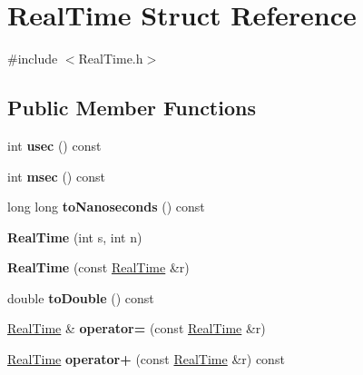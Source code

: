 \hypertarget{struct_real_time}{}\section{Real\+Time Struct Reference}
\label{struct_real_time}


{\ttfamily \#include $<$Real\+Time.\+h$>$}

\subsection*{Public Member Functions}
\begin{DoxyCompactItemize}
\item 
\mbox{\label{struct_real_time_a326b7e7bf06d9aa4bac192a15d92a8bd}} 
int {\bfseries usec} () const
\item 
\mbox{\label{struct_real_time_a82d58867cd3c682af9882abb4407645c}} 
int {\bfseries msec} () const
\item 
\mbox{\label{struct_real_time_a4638502d757c95df8b16bd004640b0cd}} 
long long {\bfseries to\+Nanoseconds} () const
\item 
\mbox{\label{struct_real_time_aa6a279c933aaaa966279befaef4bc52a}} 
{\bfseries Real\+Time} (int s, int n)
\item 
\mbox{\label{struct_real_time_a6d0310b29c3cd34413a36a34c3100184}} 
{\bfseries Real\+Time} (const \hyperlink{struct_real_time}{Real\+Time} \&r)
\item 
\mbox{\label{struct_real_time_ae521066471d17cd93ee03e3e32bed6d6}} 
double {\bfseries to\+Double} () const
\item 
\mbox{\label{struct_real_time_a74a68864f6f6425e6a327f5e67160b2a}} 
\hyperlink{struct_real_time}{Real\+Time} \& {\bfseries operator=} (const \hyperlink{struct_real_time}{Real\+Time} \&r)
\item 
\mbox{\label{struct_real_time_af0a434cdbd5132e478dfe1c5c6098cca}} 
\hyperlink{struct_real_time}{Real\+Time} {\bfseries operator+} (const \hyperlink{struct_real_time}{Real\+Time} \&r) const

\end{DoxyCompactItemize}
